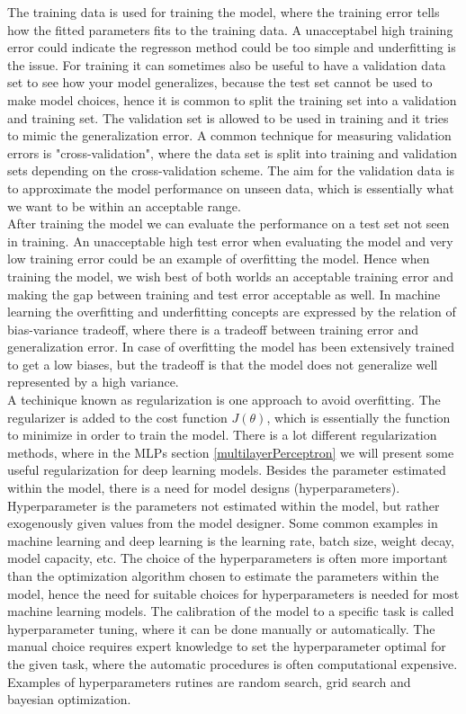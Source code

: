 The training data is used for training the model, where the training error tells how the fitted parameters fits to the training data. A unacceptabel high training error could indicate the regresson method could be too simple and underfitting is the issue. For training it can sometimes also be useful to have a validation data set to see how your model generalizes, because the test set cannot be used to make model choices, hence it is common to split the training set into a validation and training set. The validation set is allowed to be used in training and it tries to mimic the generalization error. A common technique for measuring validation errors is "cross-validation", where the data set is split into training and validation sets depending on the cross-validation scheme. The aim for the validation data is to approximate the model performance on unseen data, which is essentially what we want to be within an acceptable range.\\

After training the model we can evaluate the performance on a test set not seen in training. An unacceptable high test error when evaluating the model and very low training error could be an example of overfitting the model. Hence when training the model, we wish best of both worlds an acceptable training error and making the gap between training and test error acceptable as well. In machine learning the overfitting and underfitting concepts are expressed by the relation of bias-variance tradeoff, where there is a tradeoff between training error and generalization error. In case of overfitting the model has been extensively trained to get a low biases, but the tradeoff is that the model does not generalize well represented by a high variance.\\

A techinique known as regularization is one approach to avoid overfitting. The regularizer is added to the cost function $J(\theta)$, which is essentially the function to minimize in order to train the model. There is a lot different regularization methods, where in the MLPs section \ref{multilayerPerceptron} we will present some useful regularization for deep learning models. Besides the parameter estimated within the model, there is a need for model designs (hyperparameters).\\

Hyperparameter is the parameters not estimated within the model, but rather exogenously given values from the model designer. Some common examples in machine learning and deep learning is the learning rate, batch size, weight decay, model capacity, etc. The choice of the hyperparameters is often more important than the optimization algorithm chosen to estimate the parameters within the model, hence the need for suitable choices for hyperparameters is needed for most machine learning models. The calibration of the model to a specific task is called hyperparameter tuning, where it can be done manually or automatically. The manual choice requires expert knowledge to set the hyperparameter optimal for the given task, where the automatic procedures is often computational expensive. Examples of hyperparameters rutines are random search, grid search and bayesian optimization.\\

